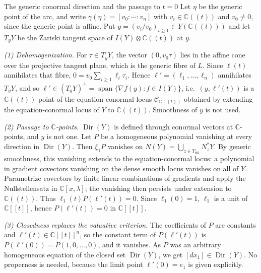 \documentclass[11pt]{amsart}
\numberwithin{equation}{section}
\theoremstyle{plain}
\theoremstyle{remark}
\newcommand{\Dir}{\operatorname{Dir}}
\newcommand{\sm}{\mathrm{sm}}
\begin{document}
\begin{AIaddition}{The generic conormal direction and the passage to $t=0$}
Let $\eta$ be the generic point of the arc, and write
$\gamma(\eta)=[v_0:\cdots:v_n]$ with $v_i\in\mathbb C((t))$ and $v_0\neq0$, since the generic point is affine. Put
$y=(v_i/v_0)_{i\ge1}\in Y(\mathbb C((t)))$ and let $T_yY$ be the Zariski
tangent space of $I(Y)\otimes\mathbb C((t))$ at $y$.

\emph{(1) Dehomogenization.} For $\tau\in T_yY$, the vector $(0,v_0\tau)$ lies in the
affine cone over the projective tangent plane, which is the generic fibre of $L$.
Since $\ell(t)$ annihilates that fibre,
$0=v_0\sum_{i\ge1}\ell_i\tau_i$. Hence $\ell'=(\ell_1,\dots,\ell_n)$ annihilates
$T_yY$, and so $\ell'\in(T_yY)^\perp=\operatorname{span}\{\nabla f(y):f\in I(Y)\}$,
i.e.\ $(y,\ell'(t))$ is a $\mathbb C((t))$-point of the equation-conormal locus
$\mathcal C_{\mathbb C((t))}$ obtained by extending the equation-conormal locus of $Y$ to $\mathbb C((t))$. Smoothness of $y$ is not used.

\emph{(2) Passage to $\mathbb C$-points.} $\Dir(Y)$ is defined through conormal
vectors at $\mathbb C$-points, and $y$ is not one. Let $P$ be a homogeneous
polynomial vanishing at every direction in $\Dir(Y)$. Then $\xi_1P$ vanishes on
$N(Y)=\bigcup_{z\in Y_{\sm}}N^*_zY$. By generic smoothness, this vanishing
extends to the equation-conormal locus: a polynomial in gradient covectors
vanishing on the dense smooth locus vanishes on all of $Y$. Parametrize
covectors by finite linear combinations of gradients and apply the
Nullstellensatz in $\mathbb C[x,\lambda]$; the vanishing then persists
under extension to $\mathbb C((t))$. Thus
$\ell_1(t)P(\ell'(t))=0$. Since $\ell_1(0)=1$, $\ell_1$ is a unit of
$\mathbb C[[t]]$, hence $P(\ell'(t))=0$ in $\mathbb C[[t]]$.

\emph{(3) Closedness replaces the valuative criterion.} The coefficients of $P$
are constants and $\ell'(t)\in\mathbb C[[t]]^n$, so the constant term of
$P(\ell'(t))$ is $P(\ell'(0))=P(1,0,\dots,0)$, and it vanishes. As $P$ was an
arbitrary homogeneous equation of the closed set $\Dir(Y)$, we get
$[dx_1]\in\Dir(Y)$. No properness is needed, because the limit point
$\ell'(0)=e_1$ is given explicitly.
\end{AIaddition}
\end{document}
